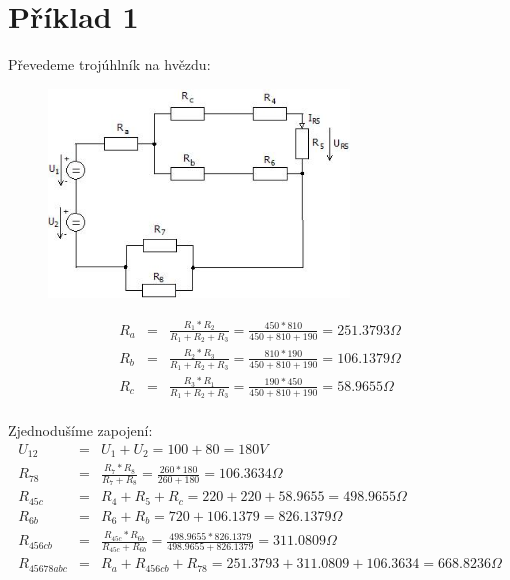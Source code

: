 \section{Příklad 1}

Převedeme trojúhlník na hvězdu:
    \begin{figure}[h]
		\begin{center}
			\includegraphics[width=8cm,keepaspectratio]{fig/Pr1_1_2019.jpeg}
		\end{center}
	\end{figure}
	\begin{eqnarray*}
        R_{a} &= & \frac{R_{1} * R_{2}}{R_{1} + R_{2} + R_{3}} = \frac{450 * 810}{450 + 810 + 190} = 251.3793 \Omega\\
        R_{b} &= & \frac{R_{2} * R_{3}}{R_{1} + R_{2} + R_{3}} = \frac{810 * 190}{450 + 810 + 190} = 106.1379 \Omega\\
        R_{c} &= & \frac{R_{3} * R_{1}}{R_{1} + R_{2} + R_{3}} = \frac{190 * 450}{450 + 810 + 190} = 58.9655 \Omega\\
	\end{eqnarray*}

Zjednodušíme zapojení:
    \begin{eqnarray*}
        U_{12} &= & U_{1} + U_{2} = 100 + 80 = 180 V\\
		R_{78} &= & \frac{R_{7} * R_{8}}{R_{7} + R_{8}} = \frac{260 * 180}{260 + 180} = 106.3634 \Omega\\
		R_{45c} &= & R_{4} + R_{5} + R_{c} = 220 + 220 + 58.9655 = 498.9655 \Omega\\
		R_{6b} &= & R_{6} + R_{b} = 720 + 106.1379 = 826.1379 \Omega\\
		R_{456cb} &= & \frac{R_{45c} * R_{6b}}{R_{45c} + R_{6b}} = \frac{498.9655 * 826.1379}{498.9655 + 826.1379} = 311.0809 \Omega\\
		R_{45678abc} &= & R_{a} + R_{456cb} + R_{78} = 251.3793 + 311.0809 + 106.3634 = 668.8236 \Omega\\
	\end{eqnarray*}

